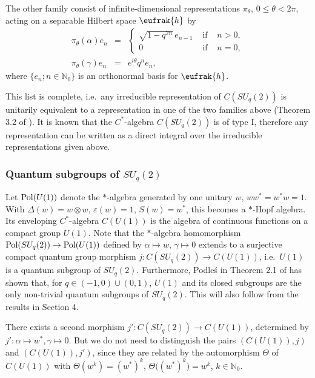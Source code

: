 \documentclass[12pt]{amsart}
\theoremstyle{definition}
\theoremstyle{remark}
\numberwithin{equation}{section}
\begin{document}
The other family consist of infinite-dimensional representations $\pi_\theta$, $0\le \theta< 2\pi$, acting on a separable Hilbert space $\eufrak{h}$ by
\begin{eqnarray*}
\pi_\theta(\alpha)e_n &=& \left\{
\begin{array}{ccl}
\sqrt{1-q^{2n}}\,e_{n-1} & \mbox{ if } & n>0, \\
0 & \mbox{ if } & n=0,
\end{array}\right. \\
\pi_\theta(\gamma)e_n &=& e^{i\theta}q^ne_n,
\end{eqnarray*}
where $\{e_n;n\in\mathbb{N}_0\}$ is an orthonormal basis for $\eufrak{h}$.

This list is complete, i.e.\ any irreducible representation of $C(SU_q(2))$ is unitarily equivalent
to a representation in one of the two families above (Theorem 3.2 of \cite{vaksman+soibelman88}).
It is known that the $C^*$-algebra $C(SU_q(2))$ is of type I, therefore any representation can be
written as a direct integral over the irreducible representations given above.

\subsubsection{Quantum subgroups of $SU_q(2)$}

Let ${\rm Pol}(U(1))$ denote the $*$-algebra generated by one unitary $w$, $ww^*=w^*w=1$. With
$\Delta(w)=w\otimes w$, $\varepsilon(w)=1$, $S(w)=w^*$, this becomes a $*$-Hopf algebra. Its
enveloping $C^*$-algebra $C(U(1))$ is the algebra of continuous functions on a compact group $U(1)$. Note that the $*$-algebra
homomorphism ${\rm Pol}(SU_q(2)) \to {\rm Pol}(U(1))$ defined by $\alpha\mapsto w$, $\gamma\mapsto
0$ extends to a surjective compact quantum group morphism $j:C(SU_q(2))\to C(U(1))$, i.e.\ $U(1)$
is a quantum subgroup of $SU_q(2)$. Furthermore, Podle\'s in Theorem 2.1 of \cite{podles95} has
shown that, for $q\in(-1,0)\cup(0,1)$, $U(1)$ and its closed subgroups are the only non-trivial
quantum subgroups of $SU_q(2)$. This will also follow from the results in Section 4.

There exists a second morphism $j':C(SU_q(2))\to C(U(1))$, determined by $j':\alpha\mapsto w^*,
\gamma\mapsto 0$. But we do not need to distinguish the pairs $(C(U(1)),j)$ and $(C(U(1)),j')$,
since they are related by the automorphism $\Theta$ of $C(U(1))$ with $\Theta(w^k) = (w^*)^k$,
$\Theta\big((w^*)^k\big) = w^k$, $k \in \mathbb{N}_0$.
\end{document}
